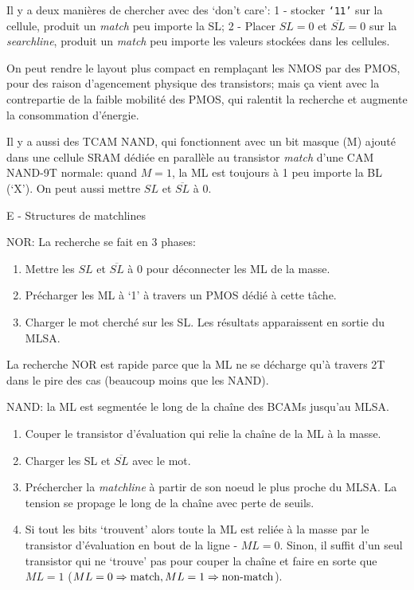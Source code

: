 Il y a deux manières de chercher avec des `don't care': 1 - stocker \texttt{`11'} sur la cellule, produit un \emph{match} peu importe la SL; 2 - Placer $SL = 0$ et $\overline{SL} = 0$ sur la \emph{searchline}, produit un \emph{match} peu importe les valeurs stockées dans les cellules.

On peut rendre le layout plus compact en remplaçant les NMOS par des PMOS, pour des raison d'agencement physique des transistors; mais ça vient avec la contrepartie de la faible mobilité des PMOS, qui ralentit la recherche et augmente la consommation d'énergie.

Il y a aussi des TCAM NAND, qui fonctionnent avec un bit masque (M) ajouté dans une cellule SRAM dédiée en parallèle au transistor \emph{match} d'une CAM NAND-9T normale: quand $M = 1$, la ML est toujours à 1 peu importe la BL (`X'). On peut aussi mettre $SL$ et $\overline{SL}$ à 0.

E - Structures de matchlines

NOR: La recherche se fait en 3 phases:
\begin{enumerate}
	\item Mettre les $SL$ et $\overline{SL}$ à 0 pour déconnecter les ML de la masse.
	\item Précharger les ML à `1' à travers un PMOS dédié à cette tâche.
	\item Charger le mot cherché sur les SL. Les résultats apparaissent en sortie du MLSA.
\end{enumerate}

La recherche NOR est rapide parce que la ML ne se décharge qu'à travers 2T dans le pire des cas (beaucoup moins que les NAND).

NAND: la ML est segmentée le long de la chaîne des BCAMs jusqu'au MLSA.
\begin{enumerate}
	\item Couper le transistor d'évaluation qui relie la chaîne de la ML à la masse.
	\item Charger les SL et $\overline{SL}$ avec le mot.
	\item Préchercher la \emph{matchline} à partir de son noeud le plus proche du MLSA. La tension se propage le long de la chaîne avec perte de seuils.
	\item Si tout les bits `trouvent' alors toute la ML est reliée à la masse par le transistor d'évaluation en bout de la ligne - $ML = 0$. Sinon, il suffit d'un seul transistor qui ne `trouve' pas pour couper la chaîne et faire en sorte que $ML = 1$ ($ML = 0 \Rightarrow \textrm{match}, ML = 1 \Rightarrow \textrm{non-match}$).
\end{enumerate}

